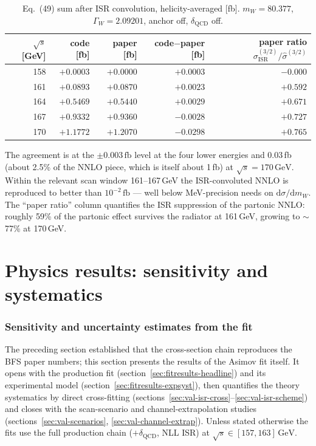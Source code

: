 \documentclass[11pt,a4paper]{article}
\newcommand{\mW}{m_W}
\newcommand{\GammaW}{\Gamma_W}
\newcommand{\sqrts}{\sqrt{s}}
\newcommand{\fb}{\ensuremath{\,\mathrm{fb}}}
\newcommand{\GeV}{\ensuremath{\,\mathrm{GeV}}}
\begin{document}
\begin{table}[h]
\centering
\caption{Eq.~(49) sum after ISR convolution, helicity-averaged [fb].
$\mW=80.377$, $\GammaW=2.09201$, anchor off, $\delta_\text{QCD}$ off.}
\begin{tabular}{r r r r r}
\toprule
$\sqrts$ [GeV] & code [fb] & paper [fb] & code$-$paper [fb] &
paper ratio $\sigma^{(3/2)}_\text{ISR}/\hat\sigma^{(3/2)}$ \\
\midrule
158 & $+0.0003$ & $+0.0000$ & $+0.0003$ & $-0.000$ \\
161 & $+0.0893$ & $+0.0870$ & $+0.0023$ & $+0.592$ \\
164 & $+0.5469$ & $+0.5440$ & $+0.0029$ & $+0.671$ \\
167 & $+0.9332$ & $+0.9360$ & $-0.0028$ & $+0.727$ \\
170 & $+1.1772$ & $+1.2070$ & $-0.0298$ & $+0.765$ \\
\bottomrule
\end{tabular}
\end{table}

The agreement is at the $\pm 0.003\fb$ level at the four lower energies
and 0.03\,fb (about 2.5\% of the NNLO piece, which is itself about 1\,fb)
at $\sqrts=170\GeV$. Within the relevant scan window 161–167\,GeV the
ISR-convoluted NNLO is reproduced to better than $10^{-2}\fb$ — well
below MeV-precision needs on $\mathrm{d}\sigma/\mathrm{d}\mW$. The
``paper ratio'' column quantifies the ISR suppression of the
partonic NNLO: roughly 59\% of the partonic effect survives the radiator
at 161\,GeV, growing to $\sim$77\% at 170\,GeV.

\clearpage
\part{Physics results: sensitivity and systematics}\label{part:results}

\section{Sensitivity and uncertainty estimates from the fit}\label{sec:fitresults}

The preceding section established that the cross-section chain reproduces
the BFS paper numbers; this section presents the results of the Asimov
fit itself. It opens with the production fit
(section~\ref{sec:fitresults-headline}) and its experimental model
(section~\ref{sec:fitresults-expsyst}), then quantifies the theory
systematics by direct cross-fitting
(sections~\ref{sec:val-isr-cross}--\ref{sec:val-isr-scheme}) and closes
with the scan-scenario and channel-extrapolation studies
(sections~\ref{sec:val-scenarios}, \ref{sec:val-channel-extrap}).
Unless stated otherwise the fits use the full production chain
($+\delta_\text{QCD}$, NLL ISR) at $\sqrts\in[157,163]\GeV$.
\end{document}
